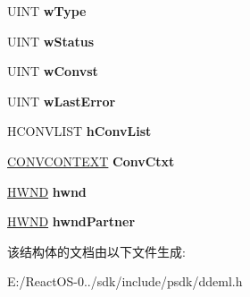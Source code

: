 \begin{DoxyCompactItemize}
U\+I\+NT {\bfseries w\+Type}
\item 
\mbox{\label{structtag_c_o_n_v_i_n_f_o_ac219f29b26de8d089353bc2d61131630}} 
U\+I\+NT {\bfseries w\+Status}
\item 
\mbox{\label{structtag_c_o_n_v_i_n_f_o_aaae07089d87c6ace24c786b0e0a65c1e}} 
U\+I\+NT {\bfseries w\+Convst}
\item 
\mbox{\label{structtag_c_o_n_v_i_n_f_o_a500c92e00af48e489dd658c1cb650c7d}} 
U\+I\+NT {\bfseries w\+Last\+Error}
\item 
\mbox{\label{structtag_c_o_n_v_i_n_f_o_a820d224e166e656fc6ab8267a069a827}} 
H\+C\+O\+N\+V\+L\+I\+ST {\bfseries h\+Conv\+List}
\item 
\mbox{\label{structtag_c_o_n_v_i_n_f_o_a86784910216f0f3a45b9fe752e6a6b9c}} 
\hyperlink{structtag_c_o_n_v_c_o_n_t_e_x_t}{C\+O\+N\+V\+C\+O\+N\+T\+E\+XT} {\bfseries Conv\+Ctxt}
\item 
\mbox{\label{structtag_c_o_n_v_i_n_f_o_a2e0234cb9bef112754913d376076cd36}} 
\hyperlink{interfacevoid}{H\+W\+ND} {\bfseries hwnd}
\item 
\mbox{\label{structtag_c_o_n_v_i_n_f_o_a76ed8551736660ae32ca49bc8e80c7c9}} 
\hyperlink{interfacevoid}{H\+W\+ND} {\bfseries hwnd\+Partner}
\end{DoxyCompactItemize}


该结构体的文档由以下文件生成\+:\begin{DoxyCompactItemize}
\item 
E\+:/\+React\+O\+S-\/0../sdk/include/psdk/ddeml.\+h\end{DoxyCompactItemize}
